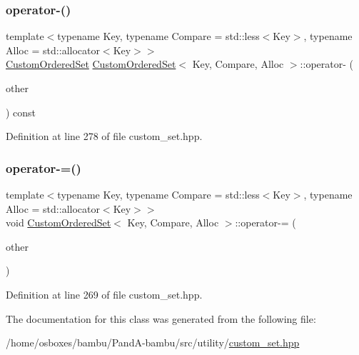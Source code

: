 \subsubsection{\texorpdfstring{operator-\/()}{operator-()}}
{\footnotesize\ttfamily template$<$typename Key, typename Compare = std\+::less$<$\+Key$>$, typename Alloc = std\+::allocator$<$\+Key$>$$>$ \\
\hyperlink{classCustomOrderedSet}{Custom\+Ordered\+Set} \hyperlink{classCustomOrderedSet}{Custom\+Ordered\+Set}$<$ Key, Compare, Alloc $>$\+::operator-\/ (\begin{DoxyParamCaption}\item[{const \hyperlink{classCustomOrderedSet}{Custom\+Ordered\+Set}$<$ Key, Compare, Alloc $>$ \&}]{other }\end{DoxyParamCaption}) const\hspace{0.3cm}{\ttfamily [inline]}}



Definition at line 278 of file custom\+\_\+set.\+hpp.

\mbox{\label{classCustomOrderedSet_aa1e2187d66a483b1860700080cc6f513}} 
\subsubsection{\texorpdfstring{operator-\/=()}{operator-=()}}
{\footnotesize\ttfamily template$<$typename Key, typename Compare = std\+::less$<$\+Key$>$, typename Alloc = std\+::allocator$<$\+Key$>$$>$ \\
void \hyperlink{classCustomOrderedSet}{Custom\+Ordered\+Set}$<$ Key, Compare, Alloc $>$\+::operator-\/= (\begin{DoxyParamCaption}\item[{const \hyperlink{classCustomOrderedSet}{Custom\+Ordered\+Set}$<$ Key, Compare, Alloc $>$ \&}]{other }\end{DoxyParamCaption})\hspace{0.3cm}{\ttfamily [inline]}}



Definition at line 269 of file custom\+\_\+set.\+hpp.



The documentation for this class was generated from the following file\+:\begin{DoxyCompactItemize}
\item 
/home/osboxes/bambu/\+Pand\+A-\/bambu/src/utility/\hyperlink{custom__set_8hpp}{custom\+\_\+set.\+hpp}\end{DoxyCompactItemize}
